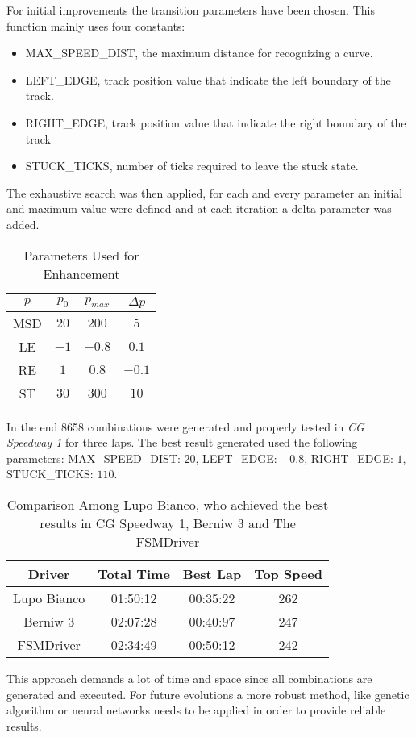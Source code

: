 For initial improvements the transition parameters have been chosen. This function mainly uses four constants:
\begin{itemize}
\item MAX\_SPEED\_DIST, the maximum distance for recognizing a curve.
\item LEFT\_EDGE, track position value that indicate the left boundary of the track.
\item RIGHT\_EDGE, track position value that indicate the right boundary of the track
\item STUCK\_TICKS, number of ticks required to leave the stuck state.
\end{itemize}

The exhaustive search was then applied, for each and every parameter an initial and maximum value were defined and at each iteration a delta parameter was added.

\begin{table}[h]
\renewcommand{\arraystretch}{1.3}
\caption{Parameters Used for Enhancement}
\label{parameter_table}
\centering
\begin{tabular}{c||c||c||c}
\hline \bfseries $p$ &\bfseries $p_0$ &\bfseries $ p_{max}$ &\bfseries $\Delta p$ \\
\hline
\hline MSD & $20$ & $200$ & $5$ \\ 
\hline LE & $-1$ & $-0.8$ & $0.1$ \\ 
\hline RE & $1$ & $0.8$ & $-0.1$ \\ 
\hline ST & $30$ & $300$ & $10$ \\ 
\hline 
\end{tabular} 
\end{table}

In the end 8658 combinations were generated and properly tested in \textit{CG Speedway 1}
for three laps. The best result generated used the following parameters: MAX\_SPEED\_DIST: $20$, LEFT\_EDGE: $-0.8$, RIGHT\_EDGE: $1$, STUCK\_TICKS: $110$.

\begin{table}[h]
\renewcommand{\arraystretch}{1.3}
\caption{Comparison Among Lupo Bianco, who achieved the best results in CG Speedway 1, Berniw 3 and The FSMDriver}
\label{results_table}
\centering

\begin{tabular}{c||c||c||c}
\hline \bfseries Driver &\bfseries Total Time &\bfseries Best Lap &\bfseries Top Speed \\
\hline
\hline Lupo Bianco & 01:50:12 & 00:35:22 & 262 \\
\hline Berniw 3 & 02:07:28 & 00:40:97 & 247 \\ 
\hline FSMDriver & 02:34:49 & 00:50:12 & 242 \\ 
\hline 
\end{tabular}
\end{table}
This approach demands a lot of time and space since all combinations are generated and executed. For future evolutions a more robust method, like genetic algorithm or neural networks needs to be applied in order to provide reliable results.